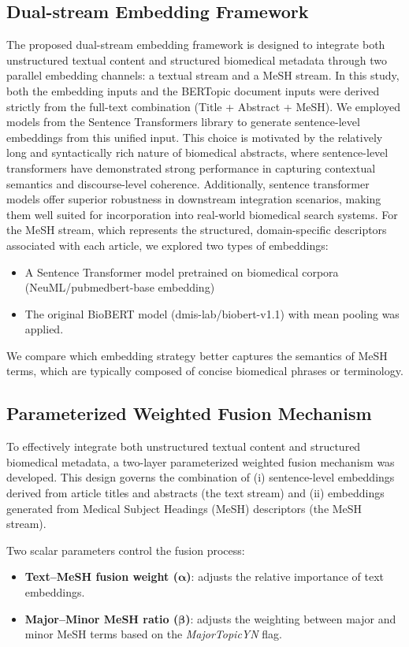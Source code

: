 \documentclass{ieeeaccess}
\begin{document}
\subsection{Dual-stream Embedding Framework}
The proposed dual-stream embedding framework is designed to integrate both unstructured textual content and structured biomedical metadata through two parallel embedding channels: a textual stream and a MeSH stream.
In this study, both the embedding inputs and the BERTopic document inputs were derived strictly from the full-text combination (Title + Abstract + MeSH). We employed models from the Sentence Transformers library to generate sentence-level embeddings from this unified input. This choice is motivated by the relatively long and syntactically rich nature of biomedical abstracts, where sentence-level transformers have demonstrated strong performance in capturing contextual semantics and discourse-level coherence\cite{reimers_sentence-bert_2019}. Additionally, sentence transformer models offer superior robustness in downstream integration scenarios, making them well suited for incorporation into real-world biomedical search systems.
For the MeSH stream, which represents the structured, domain-specific descriptors associated with each article, we explored two types of embeddings:
\begin{itemize}
    \item A Sentence Transformer model pretrained on biomedical corpora (NeuML/pubmedbert-base embedding)
    \item The original BioBERT model (dmis-lab/biobert-v1.1) with mean pooling was applied.
\end{itemize}
We compare which embedding strategy better captures the semantics of MeSH terms, which are typically composed of concise biomedical phrases or terminology.

\subsection{Parameterized Weighted Fusion Mechanism}
To effectively integrate both unstructured textual content and structured biomedical metadata, 
a two-layer parameterized weighted fusion mechanism was developed. 
This design governs the combination of 
(i) sentence-level embeddings derived from article titles and abstracts (the text stream) and 
(ii) embeddings generated from Medical Subject Headings (MeSH) descriptors (the MeSH stream). 

Two scalar parameters control the fusion process: 
\begin{itemize}
    \item \textbf{Text–MeSH fusion weight ($\boldsymbol{\alpha}$)}: adjusts the relative importance of text embeddings. 
    \item \textbf{Major–Minor MeSH ratio ($\boldsymbol{\beta}$)}: adjusts the weighting between major and minor MeSH terms based on the \textit{MajorTopicYN} flag. 
\end{itemize}
\end{document}
